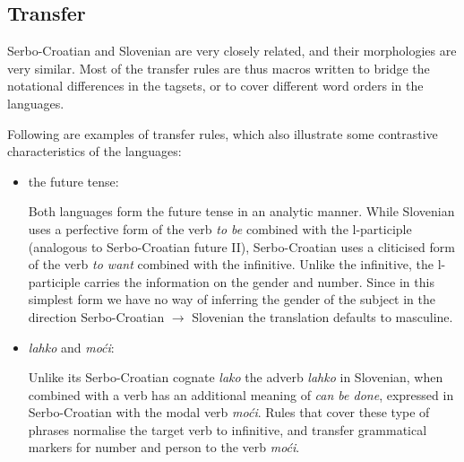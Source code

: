 \subsection{Transfer}

Serbo-Croatian and Slovenian are very closely related, and their
morphologies are very similar. Most of the transfer rules are thus
macros written to bridge the notational differences in the tagsets, 
or to cover different word orders in the languages.

Following are examples of transfer rules, which also illustrate some
contrastive characteristics of the languages:

\begin{itemize}
\item the future tense:

Both languages form the future tense in an analytic manner. While Slovenian
uses a perfective form of the verb \emph{to be} combined with the l-participle (analogous
to Serbo-Croatian future II), Serbo-Croatian uses a cliticised form of the verb \emph{to
  want} combined with the infinitive. Unlike the infinitive, the
l-participle carries the information on the gender and number. Since
in this simplest form we have no way of inferring the gender of the
subject in the direction Serbo-Croatian $\rightarrow$ Slovenian the translation defaults
to masculine.

\item \emph{lahko} and \emph{moći}:

Unlike its Serbo-Croatian cognate \emph{lako} the adverb \emph{lahko} in
Slovenian, when combined with a verb has an additional meaning of \emph{can be
  done}, expressed in Serbo-Croatian with the modal verb \emph{moći}. Rules that
cover these type of phrases normalise the target verb to infinitive,
and transfer grammatical markers for number and person to the verb \emph{moći}.


\end{itemize}
